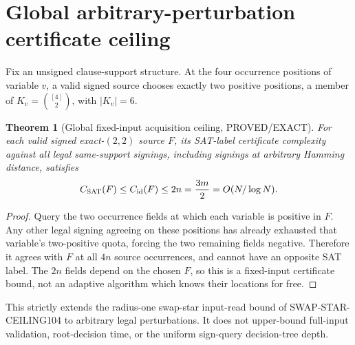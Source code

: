 \documentclass[11pt]{article}
\newtheorem{theorem}{Theorem}
\begin{document}
\section{Global arbitrary-perturbation certificate ceiling}
Fix an unsigned clause-support structure. At the four occurrence positions of variable $v$, a valid signed source chooses exactly two positive positions, a member of $K_v=\binom{[4]}2$, with $|K_v|=6$.
\begin{theorem}[Global fixed-input acquisition ceiling, PROVED/EXACT]
For each valid signed exact-$(2,2)$ source $F$, its SAT-label certificate complexity against \emph{all} legal same-support signings, including signings at arbitrary Hamming distance, satisfies
\[
C_{\rm SAT}(F)\le C_{\rm id}(F)\le 2n=\frac{3m}{2}=O(N/\log N).
\]
\end{theorem}
\begin{proof}
Query the two occurrence fields at which each variable is positive in $F$. Any other legal signing agreeing on these positions has already exhausted that variable's two-positive quota, forcing the two remaining fields negative. Therefore it agrees with $F$ at all $4n$ source occurrences, and cannot have an opposite SAT label. The $2n$ fields depend on the chosen $F$, so this is a fixed-input certificate bound, not an adaptive algorithm which knows their locations for free.
\end{proof}
This strictly extends the radius-one swap-star input-read bound of SWAP-STAR-CEILING104 to arbitrary legal perturbations. It does not upper-bound full-input validation, root-decision time, or the uniform sign-query decision-tree depth.
\end{document}
